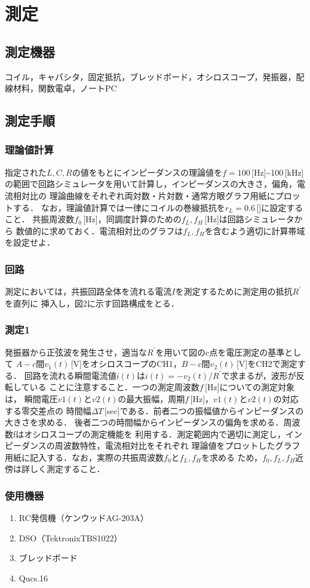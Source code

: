 
\section{測定}

\subsection*{測定機器}
コイル，キャパシタ，固定抵抗，ブレッドボード，オシロスコープ，発振器，配線材料，関数電卓，ノートPC

\subsection*{測定手順}
\subsubsection*{理論値計算}
指定された$L,C,R$の値をもとにインピーダンスの理論値を$f = 100$\,[Hz]\sim 100\,[kHz]
の範囲で回路シミュレータを用いて計算し，インピーダンスの大きさ，偏角，電流相対比の
理論曲線をそれぞれ両対数・片対数・通常方眼グラフ用紙にプロットする．
なお，理論値計算では一律にコイルの巻線抵抗を$r_L = 0.6$\,[\Omega]に設定すること．
共振周波数$f_0$\,[Hz]，同調度計算のための$f_L,f_H$\,[Hz]は回路シミュレータから
数値的に求めておく．電流相対比のグラフは$f_L,f_H$を含むよう適切に計算帯域を設定せよ．

\subsubsection*{回路}
測定においては，共振回路全体を流れる電流$I$を測定するために測定用の抵抗$R^{\prime}$を直列に
挿入し，図2に示す回路構成をとる．

\subsubsection*{測定1}
発振器から正弦波を発生させ，適当な$R^{\prime}$を用いて図のc点を電圧測定の基準として
$A-c$間$v_1(t)$\,[V]をオシロスコープのCH1，$B-c$間$v_2(t)$\,[V]をCH2で測定する．
回路を流れる瞬間電流値$i(t)$は$i(t)= -v_2 (t)/R^{\prime}$で求まるが，波形が反転している
ことに注意すること．一つの測定周波数$f$\,[Hz]についての測定対象は，
瞬間電圧$v1(t)$と$v2(t)$の最大振幅，周期$f$\,[Hz]，$v1(t)$と$v2(t)$の対応する零交差点の
時間幅$ΔT$\,[sec]である．前者二つの振幅値からインピーダンスの大きさを求める．
後者二つの時間幅からインピーダンスの偏角を求める．周波数fはオシロスコープの測定機能を
利用する．測定範囲内で適切に測定し，インピーダンスの周波数特性，電流相対比をそれぞれ
理論値をプロットしたグラフ用紙に記入する．なお，実際の共振周波数$f_0$と$f_L,f_H$を求める
ため，$f_0,f_L,f_H$近傍は詳しく測定すること．

\subsubsection*{使用機器}
\begin{enumerate}
    \item RC発信機（ケンウッド\quad AG-203A）
    \item DSO（Tektronix\quad TBS1022）
    \item ブレッドボード
    \item Qucs.16
\end{enumerate}